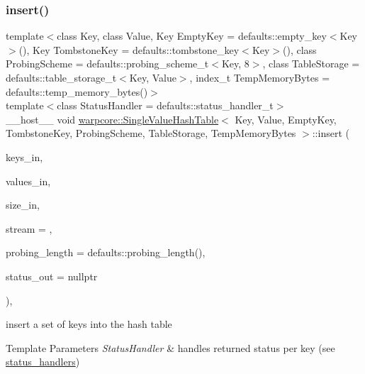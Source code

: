 \subsubsection{\texorpdfstring{insert()}{insert()}\hspace{0.1cm}{\footnotesize\ttfamily [2/2]}}
{\footnotesize\ttfamily template$<$class Key, class Value, Key Empty\+Key = defaults\+::empty\+\_\+key$<$\+Key$>$(), Key Tombstone\+Key = defaults\+::tombstone\+\_\+key$<$\+Key$>$(), class Probing\+Scheme = defaults\+::probing\+\_\+scheme\+\_\+t$<$\+Key, 8$>$, class Table\+Storage = defaults\+::table\+\_\+storage\+\_\+t$<$\+Key, Value$>$, index\+\_\+t Temp\+Memory\+Bytes = defaults\+::temp\+\_\+memory\+\_\+bytes()$>$ \\
template$<$class Status\+Handler  = defaults\+::status\+\_\+handler\+\_\+t$>$ \\
\+\_\+\+\_\+host\+\_\+\+\_\+ void \hyperlink{classwarpcore_1_1SingleValueHashTable}{warpcore\+::\+Single\+Value\+Hash\+Table}$<$ Key, Value, Empty\+Key, Tombstone\+Key, Probing\+Scheme, Table\+Storage, Temp\+Memory\+Bytes $>$\+::insert (\begin{DoxyParamCaption}\item[{key\+\_\+type $\ast$}]{keys\+\_\+in,  }\item[{value\+\_\+type $\ast$}]{values\+\_\+in,  }\item[{index\+\_\+type}]{size\+\_\+in,  }\item[{cuda\+Stream\+\_\+t}]{stream = {},  }\item[{index\+\_\+type}]{probing\+\_\+length = {\ttfamily defaults\+:\+:probing\+\_\+length()},  }\item[{typename Status\+Handler\+::base\+\_\+type $\ast$}]{status\+\_\+out = {\ttfamily nullptr} }\end{DoxyParamCaption})\hspace{0.3cm}{\ttfamily [inline]}, {\ttfamily [noexcept]}}



insert a set of keys into the hash table 


\begin{DoxyTemplParams}{Template Parameters}
{\em Status\+Handler} & handles returned status per key (see {\ttfamily \hyperlink{namespacewarpcore_1_1status__handlers}{status\+\_\+handlers}}) \\
\hline
\end{DoxyTemplParams}

